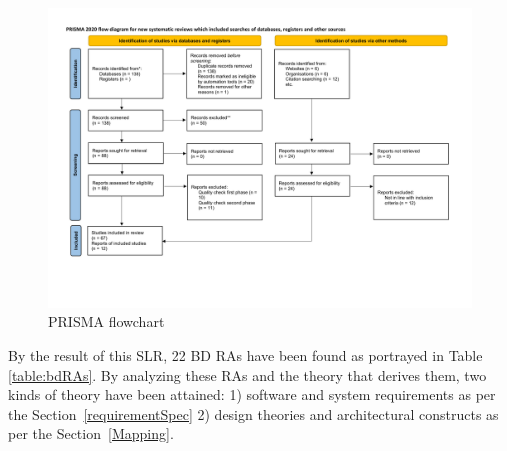 \documentclass{bmcart}
\begin{document}
\begin{figure}[t]
  \includegraphics[width=13cm]{PRISMA/PRISMA_Flow_Diagram-2.pdf}
  \caption{PRISMA flowchart}
  \label{fig:PRISMA}
\end{figure}

By the result of this SLR, 22 BD RAs have been found as portrayed in Table \ref{table:bdRAs}. By analyzing these RAs and the theory that derives them, two kinds of theory have been attained: 1) software and system requirements  as per the Section~\ref{requirementSpec} 2) design theories and architectural constructs as per the Section~\ref{Mapping}.
\end{document}
